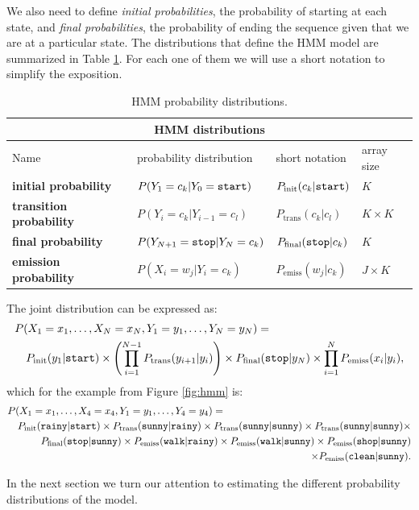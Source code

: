 We also need to define \emph{initial probabilities}, the probability of starting 
at each state, and 
\emph{final probabilities}, the probability of ending the sequence given that we are at a particular state.
 The
distributions that define the HMM model are summarized in Table
\ref{tab:hmm-dist}. 
For each one
of them we will use a short notation to simplify the exposition.
\begin{table}[h]
\begin{center}
\begin{tabular}{|l|l|l|l|}
\hline
\multicolumn{4}{|c|}{HMM distributions}\\
\hline
Name & probability distribution & short notation & array size\\
\hline
\textbf{initial probability} & $P(Y_1 = c_k | Y_0 = \text{\tt start})$ & $P_{\mathrm{init}}(c_k|\text{\tt start})$ & $K$ \\
\hline
\textbf{transition probability} & $P(Y_{i}=c_k|Y_{i-1} = c_l)$ & $P_{\mathrm{trans}}(c_k|c_l)$ & $K\times K$\\
\hline
\textbf{final probability} & $P(Y_{N+1} = \text{\tt stop} | Y_N = c_k)$ & $P_{\mathrm{final}}(\text{\tt stop}|c_k)$ & $K$\\
\hline
\textbf{emission probability} & $P(X_i=w_j| Y_i = c_k)$ & $P_{\mathrm{emiss}}(w_j|c_k)$ & $J \times K$ \\
\hline
\end{tabular}
\end{center}
\caption[HMM probability distributions]{\label{tab:hmm-dist} HMM probability distributions.}
\end{table}

The joint distribution can be expressed as:
\begin{eqnarray}\label{eqn:hmm}
\lefteqn{P(X_1=x_1,\ldots,X_N=x_N,Y_1=y_1,\ldots,Y_N=y_N)=}\nonumber\\
&&
P_{\mathrm{init}}(y_1|\text{\tt start}) 
\times
\left(
\prod_{i=1}^{N-1} P_{\mathrm{trans}}(y_{i+1}|y_i)
\right)
\times
P_{\mathrm{final}}(\text{\tt stop}|y_N)
\times 
\prod_{i=1}^{N} P_{\mathrm{emiss}}(x_i|y_i),
\end{eqnarray}
which for the example from Figure \ref{fig:hmm} is:
\begin{eqnarray}  \label{eqn:hmm_ex}
\lefteqn{P(X_1=x_1,\ldots,X_4=x_4,Y_1=y_1,\ldots,Y_4=y_4)=}\nonumber\\
&&
P_{\mathrm{init}}(\text{\tt rainy}|\text{\tt start}) 
\times
P_{\mathrm{trans}}(\text{\tt sunny}|\text{\tt rainy}) 
\times
P_{\mathrm{trans}}(\text{\tt sunny}|\text{\tt sunny}) 
\times
P_{\mathrm{trans}}(\text{\tt sunny}|\text{\tt sunny}) 
\times\nonumber\\&&
P_{\mathrm{final}}(\text{\tt stop}|\text{\tt sunny}) 
\times
P_{\mathrm{emiss}}(\text{\tt walk}|\text{\tt rainy}) 
\times
P_{\mathrm{emiss}}(\text{\tt walk}|\text{\tt sunny}) 
\times
P_{\mathrm{emiss}}(\text{\tt shop}|\text{\tt sunny}) \nonumber\\&&
\times
P_{\mathrm{emiss}}(\text{\tt clean}|\text{\tt sunny}).
\end{eqnarray}

In the next section we turn our attention to estimating the different
probability distributions of the model.
